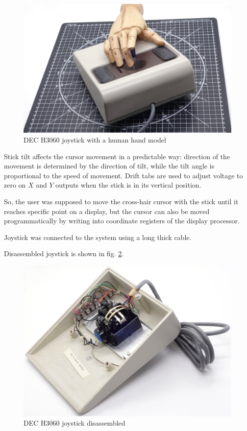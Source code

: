 \documentclass[11pt, a4paper]{article}
\begin{document}
\begin{figure}[h]
    \centering
    \includegraphics[scale=0.35]{1978_dec_h3060_joystick/hand_30.jpg}
    \caption{DEC H3060 joystick with a human hand model}
    \label{fig:DecJoystickHand}
\end{figure}

Stick tilt affects the cursor movement in a predictable way: direction of the movement is determined by the direction of tilt, while the tilt angle is proportional to the speed of movement. Drift tabs are used to adjust voltage to zero on $X$ and $Y$ outputs when the stick is in its vertical position.

So, the user was supposed to move the cross-hair cursor with the stick until it reaches specific point on a display, but the cursor can also be moved programmatically by writing into coordinate registers of the display processor.

Joystick was connected to the system using a long thick cable.

Disassembled joystick is shown in fig. \ref{fig:DecJoystickInside}. 

\begin{figure}[h]
    \centering
    \includegraphics[scale=0.5]{1978_dec_h3060_joystick/inside_30.jpg}
    \caption{DEC H3060 joystick disassembled}
    \label{fig:DecJoystickInside}
\end{figure}
\end{document}
